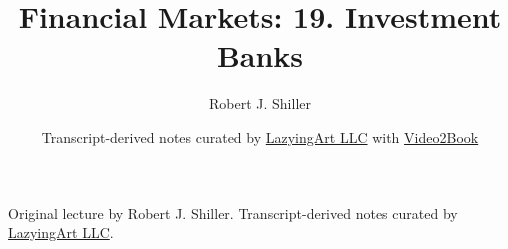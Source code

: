 \documentclass[11pt,oneside]{book}
\begin{document}
\frontmatter
\title{Financial Markets: 19. Investment Banks}
\author{Robert J. Shiller}
\date{Transcript-derived notes curated by \href{https://lazying.art}{LazyingArt LLC} with \href{https://github.com/lachlanchen/Video2Book}{Video2Book}}
\maketitle
\begin{center}
\small Original lecture by Robert J. Shiller. Transcript-derived notes curated by \href{https://lazying.art}{LazyingArt LLC}.
\end{center}
\clearpage
\mainmatter

\end{document}
